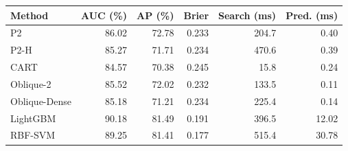 \begin{tabular}{lrrrrr}
\toprule
Method & AUC (\%) & AP (\%) & Brier & Search (ms) & Pred. (ms) \\
\midrule
P2 & 86.02 & 72.78 & 0.233 & 204.7 & 0.40 \\
P2-H & 85.27 & 71.71 & 0.234 & 470.6 & 0.39 \\
CART & 84.57 & 70.38 & 0.245 & 15.8 & 0.24 \\
Oblique-2 & 85.52 & 72.02 & 0.232 & 133.5 & 0.11 \\
Oblique-Dense & 85.18 & 71.21 & 0.234 & 225.4 & 0.14 \\
LightGBM & 90.18 & 81.49 & 0.191 & 396.5 & 12.02 \\
RBF-SVM & 89.25 & 81.41 & 0.177 & 515.4 & 30.78 \\
\bottomrule
\end{tabular}
